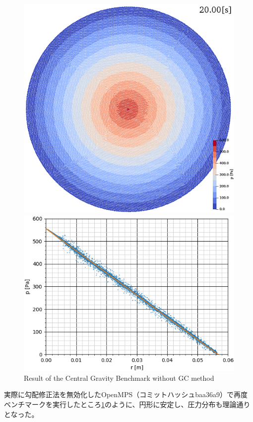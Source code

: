 		\begin{figure} \centering
			\begin{minipage}{\linewidth} \centering
				\includegraphics[clip, width=\linewidth]{img/mps_nogc_snap.png}
			\end{minipage}
			\begin{minipage}{\linewidth} \centering
				\includegraphics[clip, width=\linewidth]{img/mps_nogc_p.png}
			\end{minipage}
			\caption{Result of the Central Gravity Benchmark without GC method \label{fig:nogc}}
		\end{figure}
		実際に勾配修正法を無効化したOpenMPS（コミットハッシュbaa36a9）で再度ベンチマークを実行したところ\cref{fig:nogc}のように、円形に安定し、圧力分布も理論通りとなった。

